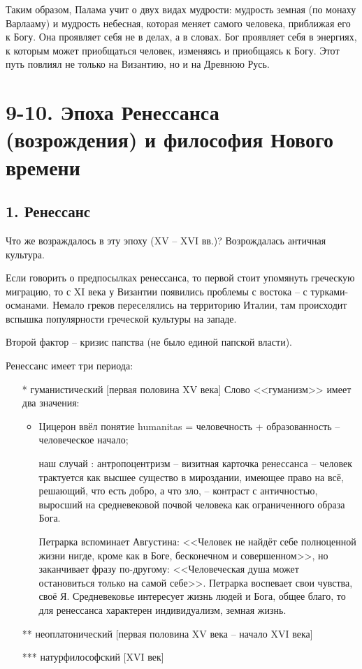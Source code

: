 \documentclass[a4paper, 12pt]{book} %
\begin{document}
Таким образом, Палама учит о двух видах  мудрости: мудрость земная (по монаху Варлааму) и мудрость небесная, которая меняет самого человека, приближая его к Богу. Она проявляет себя не в делах, а в словах. Бог проявляет себя в энергиях, к которым может приобщаться человек, изменяясь и приобщаясь к Богу. Этот путь повлиял не только на Византию, но и на Древнюю Русь.

\section*{9-10. Эпоха Ренессанса (возрождения) и философия Нового времени}
\subsection*{1. Ренессанс}
Что же возраждалось в эту эпоху (XV -- XVI вв.)? Возрождалась античная культура. 

Если говорить о предпосылках ренессанса, то первой стоит упомянуть греческую миграцию, то с XI века у Византии появились проблемы с востока -- с турками-османами. Немало греков переселялись на территорию Италии, там происходит вспышка популярности греческой культуры на западе.

Второй фактор -- кризис папства (не было единой папской власти).

Ренессанс имеет три периода:
\begin{itemize}
\item[*] гуманистический [первая половина XV века]
Слово <<гуманизм>> имеет два значения:
\begin{itemize}
\item Цицерон ввёл понятие humanitas = человечность + образованность -- человеческое начало;
\item [наш случай]: антропоцентризм -- визитная карточка ренессанса -- человек трактуется как высшее существо в мироздании, имеющее право на всё, решающий, что есть добро, а что зло, -- контраст с античностью, выросший на средневековой почвой человека как ограниченного образа Бога.

Петрарка вспоминает Августина: <<Человек не найдёт себе полноценной жизни нигде, кроме как в Боге, бесконечном и совершенном>>, но заканчивает фразу по-другому: <<Человеческая душа может остановиться только на самой себе>>. Петрарка воспевает свои чувства, своё Я. Средневековье интересует жизнь людей и Бога, общее благо, то для ренессанса характерен индивидуализм, земная жизнь. 
\end{itemize}
\item[**] неоплатонический [первая половина XV века -- начало XVI века]
\item[***] натурфилософский [XVI век]
\end{itemize}
\end{document}
